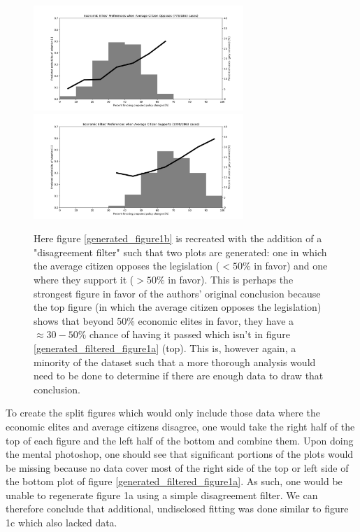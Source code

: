 \documentclass[]{article}
\begin{document}
\begin{figure}[H]
	\begin{center}
		\includegraphics[width=300px]{./figures/generated/contrasting-desires/economic-elites-preferences-when-middle-no-wants.png}
		\includegraphics[width=300px]{./figures/generated/contrasting-desires/economic-elites-preferences-when-middle-wants.png}
	\end{center}	
	\caption{Here figure \ref{generated_figure1b} is recreated with the addition of a "disagreement filter" such that two plots are generated: one in which the average citizen opposes the legislation ($< 50\%$ in favor) and one where they support it ($> 50\%$ in favor). This is perhaps the strongest figure in favor of the authors' original conclusion because the top figure (in which the average citizen opposes the legislation) shows that beyond 50\% economic elites in favor, they have a $\approx 30-50\%$ chance of having it passed which isn't in figure \ref{generated_filtered_figure1a} (top). This is, however again, a minority of the dataset such that a more thorough analysis would need to be done to determine if there are enough data to draw that conclusion.}
	\label{generated_filtered_figure1b}
\end{figure}

To create the split figures which would only include those data where the economic elites and average citizens disagree, one would take the right half of the top of each figure and the left half of the bottom and combine them.
Upon doing the mental photoshop, one should see that significant portions of the plots would be missing because no data cover most of the right side of the top or left side of the bottom plot of figure \ref{generated_filtered_figure1a}. As such, one would be unable to regenerate figure 1a using a simple disagreement filter. We can therefore conclude that additional, undisclosed fitting was done similar to figure 1c which also lacked data.\\
\end{document}
